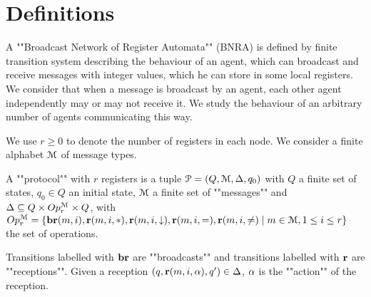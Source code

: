 \section{Definitions}

A ""Broadcast Network of Register Automata"" (BNRA) is defined by finite transition system describing the behaviour of an agent, which can broadcast and receive messages with integer values, which he can store in some local registers.
We consider that when a message is broadcast by an agent, each other agent independently may or may not receive it. 
We study the behaviour of an arbitrary number of agents communicating this way.

We use $r \geq 0$ to denote the number of registers in each node. We consider a finite alphabet $\mathcal{M}$ of message
types.

\begin{definition}[Syntax]
	A ""protocol"" with $r$ registers is a tuple $\mathcal{P} = (Q, \mathcal{M}, \Delta, q_0)$  with $Q$ a finite set of states, $q_0 \in Q$ an initial state, $\mathcal{M}$ a finite set of ""messages""  and $\Delta \subseteq Q \times Op^{\mathcal{M}}_r \times Q$, with $Op^{\mathcal{M}}_r = \{\textbf{br}(m, i), \textbf{r}(m, i, {*}), \textbf{r}(m, i, \downarrow), \textbf{r}(m, i, {=}), \textbf{r}(m, i, {\ne}) \mid m \in \mathcal{M}, 1 \leq i \leq r\}$ the set of operations.
	
	Transitions labelled with $\textbf{br}$ are ""broadcasts"" and transitions labelled with $\textbf{r}$ are ""receptions"".
	Given a reception $(q,\textbf{r}(m, i, \alpha), q') \in \Delta$, $\alpha$ is the ""action"" of the reception.
\end{definition}


